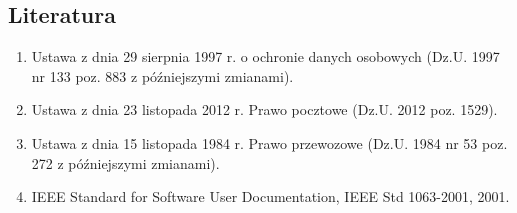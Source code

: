 \subsection{Literatura}
\label{subsec:Literatura}
\begin{enumerate}
\item Ustawa z dnia 29 sierpnia 1997 r. o ochronie danych osobowych (Dz.U. 1997 nr 133 poz. 883 z późniejszymi zmianami).
\item Ustawa z dnia 23 listopada 2012 r. Prawo pocztowe (Dz.U. 2012 poz. 1529).
\item Ustawa z dnia 15 listopada 1984 r. Prawo przewozowe (Dz.U. 1984 nr 53 poz. 272 z późniejszymi zmianami).
\item IEEE Standard for Software User Documentation, IEEE Std 1063-2001, 2001.
\end{enumerate}